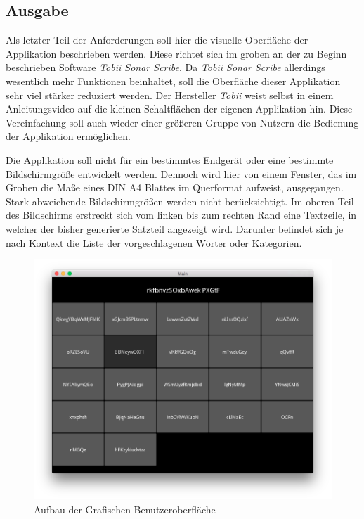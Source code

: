         
    \newpage
	\subsection{Ausgabe}
        
        Als letzter Teil der Anforderungen soll hier die visuelle Oberfläche der Applikation beschrieben werden. Diese richtet sich im groben an der zu Beginn beschrieben Software \emph{Tobii Sonar Scribe}. Da \emph{Tobii Sonar Scribe} allerdings wesentlich mehr Funktionen beinhaltet, soll die Oberfläche dieser Applikation sehr viel stärker reduziert werden. Der Hersteller \emph{Tobii} weist selbst in einem Anleitungsvideo auf die kleinen Schaltflächen der eigenen Applikation hin. \parencite[min. 0:53]{tobii:sonoScribeVideo} Diese Vereinfachung soll auch wieder einer größeren Gruppe von Nutzern die Bedienung der Applikation ermöglichen.
        
        Die Applikation soll nicht für ein bestimmtes Endgerät oder eine bestimmte Bildschirmgröße entwickelt werden. Dennoch wird hier von einem Fenster, das im Groben die Maße eines DIN A4 Blattes im Querformat aufweist, ausgegangen. Stark abweichende Bildschirmgrößen werden nicht berücksichtigt. Im oberen Teil des Bildschirms erstreckt sich vom linken bis zum rechten Rand eine Textzeile, in welcher der bisher generierte Satzteil angezeigt wird. Darunter befindet sich je nach Kontext die Liste der vorgeschlagenen Wörter oder Kategorien.
        
		\begin{figure}[H]
    		\centering
    		\includegraphics[width=15cm]{images/UI-Model.png}
    		\caption[Aufbau der Grafischen Benutzeroberfläche]{Aufbau der Grafischen Benutzeroberfläche}
    		\label{img:GUIBase}
		\end{figure}
        
